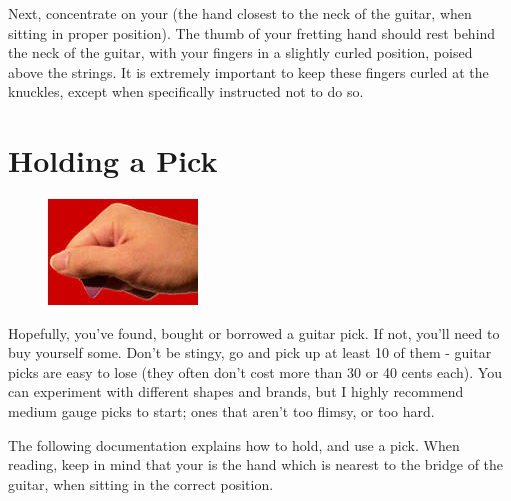 Next, concentrate on your  (the hand closest to the neck of the
guitar, when sitting in proper position). The thumb of your fretting hand
should rest behind the neck of the guitar, with your fingers in a slightly
curled position, poised above the strings. It is extremely important to keep
these fingers curled at the knuckles, except when specifically instructed not
to do so. 

\section{Holding a Pick}
\begin{figure}
\includegraphics{partone/howtoholdapick.jpg}
\end{figure}

Hopefully, you've found, bought or borrowed a guitar pick. If not, you'll need
to buy yourself some. Don't be stingy, go and pick up at least 10 of them -
guitar picks are easy to lose (they often don't cost more than 30 or 40 cents
each). You can experiment with different shapes and brands, but I highly
recommend medium gauge picks to start; ones that aren't too flimsy, or too
hard.

The following documentation explains how to hold, and use a pick. When reading,
keep in mind that your  is the hand which is nearest to the
bridge of the guitar, when sitting in the correct position.

